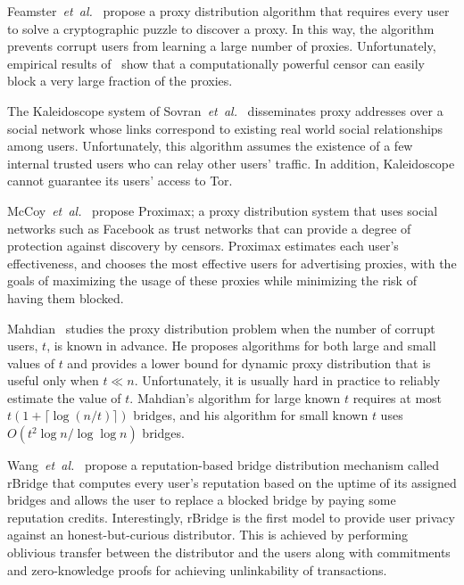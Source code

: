 \documentclass[USenglish,oneside,twocolumn]{article}
\newcommand{\etal}{\textit{et~al.}}
\newcommand{\eg}{\textit{e.g.}}
\begin{document}
Feamster~\etal~\cite{Feamster:PETS:2003} propose a proxy distribution algorithm that requires every user to solve a cryptographic puzzle to discover a proxy. In this way, the algorithm prevents corrupt users from learning a large number of proxies. Unfortunately, empirical results of~\cite{Feamster:PETS:2003} show that a computationally powerful censor can easily block a very large fraction of the proxies.

The Kaleidoscope system of Sovran~\etal~\cite{Sovran:2008:PSN} disseminates proxy addresses over a social network whose links correspond to existing real world social relationships among users. Unfortunately, this algorithm assumes the existence of a few internal trusted users who can relay other users' traffic. In addition, Kaleidoscope cannot guarantee its users' access to Tor.

McCoy~\etal~\cite{McCoy:FC:2011} propose Proximax; a proxy distribution system that uses social networks such as Facebook as trust networks that can provide a degree of protection against discovery by censors. Proximax estimates each user's effectiveness, and chooses the most effective users for advertising proxies, with the goals of maximizing the usage of these proxies while minimizing the risk of having them blocked.

Mahdian~\cite{Mahdian:2010} studies the proxy distribution problem when the number of corrupt users, $t$, is known in advance. He proposes algorithms for both large and small values of $t$ and provides a lower bound for dynamic proxy distribution that is useful only when ${t \ll n}$.
Unfortunately, it is usually hard in practice to reliably estimate the value of $t$. Mahdian's algorithm for large known $t$ requires at most ${t\left(1 + \lceil \log{(n/t)} \rceil \right)}$ bridges, and his algorithm for small known $t$ uses ${O(t^2 \log{n} / \log{\log{n}})}$ bridges.

Wang~\etal~\cite{WangLBH:rBridge:13} propose a reputation-based bridge distribution mechanism called rBridge that computes every user's reputation based on the uptime of its assigned bridges and allows the user to replace a blocked bridge by paying some reputation credits. Interestingly, rBridge is the first model to provide user privacy against an honest-but-curious distributor. This is achieved by performing oblivious transfer between the distributor and the users along with commitments and zero-knowledge proofs for achieving unlinkability of transactions.
\end{document}
